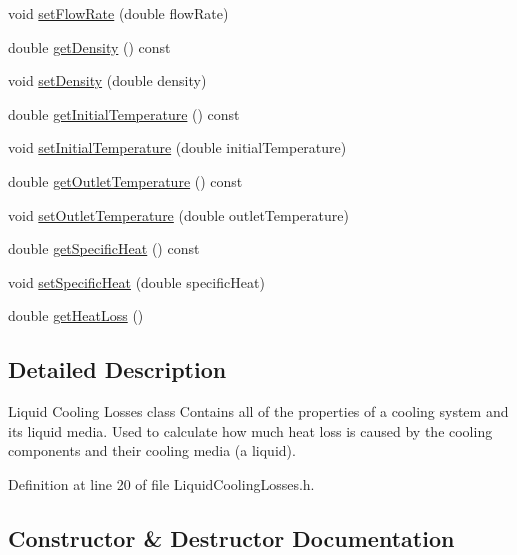 \begin{DoxyCompactItemize}
\item 
void \hyperlink{class_liquid_cooling_losses_a7739742c5f21919a62c304b7c525b1b6}{set\+Flow\+Rate} (double flow\+Rate)
\item 
double \hyperlink{class_liquid_cooling_losses_ab2a34915eeba8bcea46d67a72cbe17d2}{get\+Density} () const
\item 
void \hyperlink{class_liquid_cooling_losses_a1fcb1780b588e0a6e5ca052ce2b360dc}{set\+Density} (double density)
\item 
double \hyperlink{class_liquid_cooling_losses_a4cfb23800b80e99858bbc5c3ef5169eb}{get\+Initial\+Temperature} () const
\item 
void \hyperlink{class_liquid_cooling_losses_aa7f7718de77a96b8e269a06a24d297d8}{set\+Initial\+Temperature} (double initial\+Temperature)
\item 
double \hyperlink{class_liquid_cooling_losses_ae6364da9b374e95dd657096350464acb}{get\+Outlet\+Temperature} () const
\item 
void \hyperlink{class_liquid_cooling_losses_ab8ea8e748853e18fa480afa0b3e417ee}{set\+Outlet\+Temperature} (double outlet\+Temperature)
\item 
double \hyperlink{class_liquid_cooling_losses_aa60623b6f1fab605d25c9c24e8dd00ec}{get\+Specific\+Heat} () const
\item 
void \hyperlink{class_liquid_cooling_losses_a38ff1ff4dc0de69c72db094bf2259993}{set\+Specific\+Heat} (double specific\+Heat)
\item 
double \hyperlink{class_liquid_cooling_losses_a6a131f8f3141edef7f29df4455c6aee5}{get\+Heat\+Loss} ()
\end{DoxyCompactItemize}


\subsection{Detailed Description}
Liquid Cooling Losses class Contains all of the properties of a cooling system and its liquid media. Used to calculate how much heat loss is caused by the cooling components and their cooling media (a liquid). 

Definition at line 20 of file Liquid\+Cooling\+Losses.\+h.



\subsection{Constructor \& Destructor Documentation}
\mbox{\label{class_liquid_cooling_losses_a91eb84033b28a6bcfc817c08c317e63e}} 
